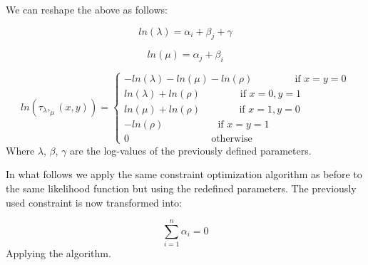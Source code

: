 \documentclass[
]{article}
\begin{document}
We can reshape the above as follows:

\[
ln(\lambda) = \alpha_i+\beta_j+\gamma
\]

\[
ln(\mu) = \alpha_j + \beta_i
\]

\[
ln(\tau_\lambda,_\mu(x,y)) = \begin{cases}
            -ln(\lambda)-ln(\mu)-ln(\rho) \qquad \qquad\ \text{if } x=y=0\\
            ln(\lambda) + ln(\rho)     \qquad\qquad \text{if } x=0, y=1\\
            ln(\mu) + ln(\rho)         \quad \quad\quad\ \ \ \ \text{if } x=1, y=0\\
            -ln(\rho)            \qquad \quad \quad\quad\ \ \text{if } x=y=1\\
            0                  \qquad \qquad \qquad \qquad \ \text{otherwise}
            \end{cases}
\] Where \(\lambda\), \(\beta\), \(\gamma\) are the log-values of the
previously defined parameters.

In what follows we apply the same constraint optimization algorithm as
before to the same likelihood function but using the redefined
parameters. The previously used constraint is now transformed into:

\[
\sum_{i=1}^n\alpha_i=0
\] Applying the algorithm.
\end{document}
